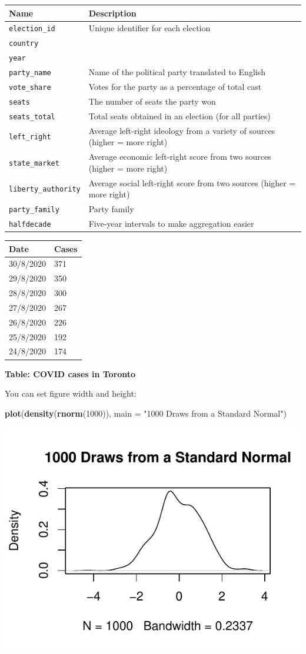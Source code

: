 \documentclass[
]{article}
\newenvironment{Shaded}{\begin{snugshade}}{\end{snugshade}}
\newcommand{\DataTypeTok}[1]{\textcolor[rgb]{0.13,0.29,0.53}{#1}}
\newcommand{\DecValTok}[1]{\textcolor[rgb]{0.00,0.00,0.81}{#1}}
\newcommand{\KeywordTok}[1]{\textcolor[rgb]{0.13,0.29,0.53}{\textbf{#1}}}
\newcommand{\NormalTok}[1]{#1}
\newcommand{\StringTok}[1]{\textcolor[rgb]{0.31,0.60,0.02}{#1}}
\begin{document}
\begin{longtable}[]{@{}ll@{}}
\toprule
Name & Description\tabularnewline
\midrule
\endhead
\texttt{election\_id} & Unique identifier for each
election\tabularnewline
\texttt{country} &\tabularnewline
\texttt{year} &\tabularnewline
\texttt{party\_name} & Name of the political party translated to
English\tabularnewline
\texttt{vote\_share} & Votes for the party as a percentage of total
cast\tabularnewline
\texttt{seats} & The number of seats the party won\tabularnewline
\texttt{seats\_total} & Total seats obtained in an election (for all
parties)\tabularnewline
\texttt{left\_right} & Average left-right ideology from a variety of
sources (higher = more right)\tabularnewline
\texttt{state\_market} & Average economic left-right score from two
sources (higher = more right)\tabularnewline
\texttt{liberty\_authority} & Average social left-right score from two
sources (higher = more right)\tabularnewline
\texttt{party\_family} & Party family\tabularnewline
\texttt{halfdecade} & Five-year intervals to make aggregation
easier\tabularnewline
\bottomrule
\end{longtable}

\begin{longtable}[]{@{}ll@{}}
\toprule
\textbf{Date} & \textbf{Cases}\tabularnewline
\midrule
\endhead
30/8/2020 & 371\tabularnewline
29/8/2020 & 350\tabularnewline
28/8/2020 & 300\tabularnewline
27/8/2020 & 267\tabularnewline
26/8/2020 & 226\tabularnewline
25/8/2020 & 192\tabularnewline
24/8/2020 & 174\tabularnewline
\bottomrule
\end{longtable}

\centering

\textbf{Table: COVID cases in Toronto} \justify

You can set figure width and height: \FloatBarrier

\begin{Shaded}
\begin{Highlighting}[]
\KeywordTok{plot}\NormalTok{(}\KeywordTok{density}\NormalTok{(}\KeywordTok{rnorm}\NormalTok{(}\DecValTok{1000}\NormalTok{)), }\DataTypeTok{main =} \StringTok{"1000 Draws from a Standard Normal"}\NormalTok{)}
\end{Highlighting}
\end{Shaded}

\begin{center}\includegraphics{extra-tutorial-markdown_files/figure-latex/unnamed-chunk-1-1} \end{center}
\end{document}
